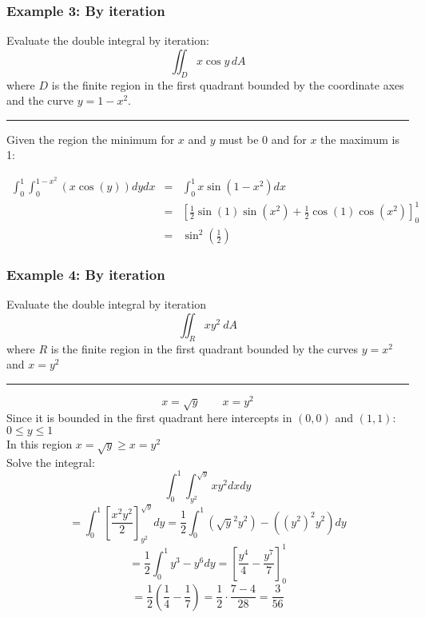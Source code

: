\subsubsection{Example 3: By iteration}
Evaluate the double integral by iteration:
$$\iint_{D}x\cos y\,d A$$
where $D$ is the finite region in the first quadrant bounded by the coordinate axes and the curve
$y=1-x^2$.

\rule{\textwidth}{0.5pt}

Given the region the minimum for $x$ and $y$ must be $0$ and for $x$ the maximum is 1:

\begin{eqnarray*}
  \int_{0}^{1}\int_{0}^{1-x^2}(x\cos(y))dydx&=&\int_{0}^{1}x \sin \left(1-x^2\right)dx\\
                                            &=&\left[\frac{1}{2} \sin (1) \sin \left(x^2\right)+\frac{1}{2} \cos (1) \cos \left(x^2\right)\right]^1_0\\
                                            &=&\boxed{\sin ^2\left(\frac{1}{2}\right)}
\end{eqnarray*}

\subsubsection{Example 4: By iteration}
Evaluate the double integral by iteration
$$\iint_Rxy^2\ dA$$
where $R$ is the finite region in the first quadrant bounded by the curves $y=x^2$ and $x=y^2$

\rule{\textwidth}{0.5pt}
$$x=\sqrt{y}\qquad x=y^2$$
Since it is bounded in the first quadrant here intercepts in $(0,0)$ and $(1,1)$: $0\leq y\leq 1$\\
In this region $x=\sqrt{y}\geq x=y^2$\\
Solve the integral:
$$\int_0^1\int_{y^2}^{\sqrt{y}}xy^2 dxdy$$
$$=\int_0^1 \left[\frac{x^2y^2}{2}\right]_{y^2}^{\sqrt{y}}dy=\frac{1}{2}\int_0^1 (\sqrt{y}^2y^2)-((y^2)^2y^2)dy$$
$$=\frac{1}{2}\int_0^1 y^3-y^6dy=\left[\frac{y^4}{4}-\frac{y^7}{7}\right]_0^1$$
$$=\frac{1}{2}\left(\frac{1}{4}- \frac{1}{7}\right)=\frac{1}{2}\cdot \frac{7-4}{28}=\frac{3}{56}$$
